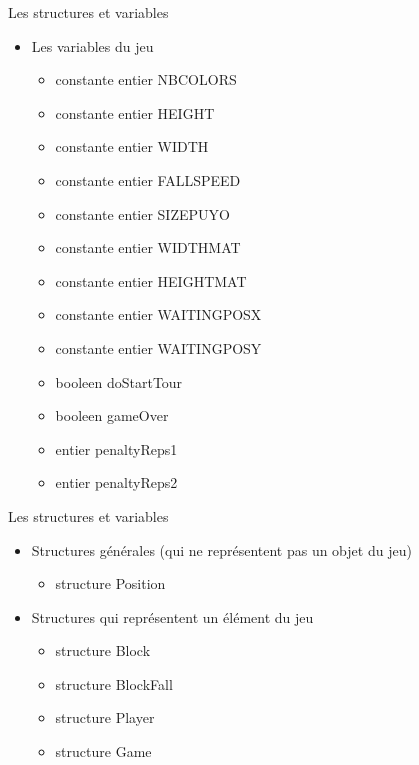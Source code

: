 \documentclass[10pt,dvipsnames,final]{beamer}
\begin{document}
\begin{frame}{Les structures et variables}
\begin{itemize}
\item Les variables du jeu
\begin{itemize}
\item constante entier NBCOLORS 
\item constante entier HEIGHT
\item constante entier WIDTH
\item constante entier FALLSPEED 
\item constante entier SIZEPUYO
\item constante entier WIDTHMAT
\item constante entier HEIGHTMAT
\item constante entier WAITINGPOSX
\item constante entier WAITINGPOSY
\item booleen doStartTour
\item booleen gameOver
\item entier penaltyReps1
\item entier penaltyReps2
\end{itemize}
\end{itemize}
\end{frame}

\begin{frame}{Les structures et variables}
\begin{itemize}
\item Structures générales (qui ne représentent pas un objet du jeu)
\begin{itemize}
\item structure Position
\end{itemize}
\item Structures qui représentent un élément du jeu
\begin{itemize}
\item structure Block
\item structure BlockFall
\item structure Player
\item structure Game
\end{itemize}
\end{itemize}
\end{frame}
\end{document}
